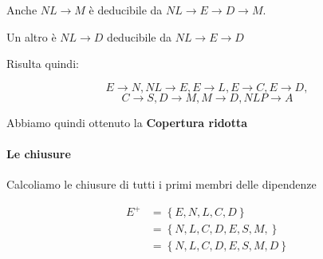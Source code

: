 \begin{exmp}
    Anche $NL \rightarrow M$ è deducibile da $ NL \rightarrow E \rightarrow D \rightarrow M$.

    Un altro è $NL \rightarrow D$ deducibile da $NL \rightarrow E \rightarrow D $ 

    Risulta quindi:

    \[
        E \rightarrow N,
        NL \rightarrow E,
        E \rightarrow L,
        E \rightarrow C,
        E \rightarrow D,
        \]
        \[
        C \rightarrow S,
        D \rightarrow M,
        M \rightarrow D,
        NLP \rightarrow A
        \]

    Abbiamo quindi ottenuto la \textbf{Copertura ridotta}

    \paragraph{Le chiusure}

    Calcoliamo le chiusure di tutti i primi membri delle dipendenze

    \begin{equation}
        \begin{split}
            E^+&= \left\{E, N,L,C,D  \right\} \\
            &= \left\{ N,L,C,D,E,S,M, \right\}  \\
            &= \left\{ N,L,C,D,E,S,M,D \right\}  \\
        \end{split}
    \end{equation}


\end{exmp}
